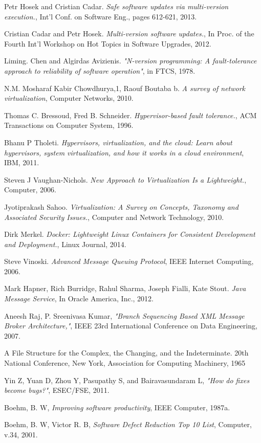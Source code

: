 \documentclass[a4paper,11pt,twoside]{report}
\begin{document}
\begin{thebibliography}{1}
  Petr Hosek and Cristian Cadar. {\em Safe software updates via multi-version execution.}, Int'l Conf. on Software Eng., pages 612-621, 2013.
 
  Cristian Cadar and Petr Hosek. {\em Multi-version software updates.}, In Proc. of the Fourth Int'l Workshop on Hot Topics in Software Upgrades, 2012.

 	 Liming. Chen and Algirdas Avizienis. {\em  "N-version programming: A fault-tolerance approach to reliability of software operation"}, in FTCS, 1978. 
   
	 N.M. Mosharaf Kabir Chowdhurya,1, Raouf Boutaba b. {\em A survey of network virtualization}, Computer Networks, 2010.
   
	 Thomas C. Bressoud, Fred B. Schneider. {\em Hypervisor-based fault tolerance.}, ACM 	Transactions on Computer System, 1996.
	   
  	 Bhanu P Tholeti. {\em Hypervisors, virtualization, and the cloud: Learn about hypervisors, system virtualization, and how it works in a cloud environment}, IBM, 2011. 

	  Steven J Vaughan-Nichols. {\em New Approach to Virtualization Is a Lightweight.}, Computer, 2006.  
	 
	   Jyotiprakash Sahoo. {\em Virtualization: A Survey on Concepts, Taxonomy and Associated Security Issues.}, Computer and Network Technology, 2010.
  
    Dirk Merkel. {\em Docker: Lightweight Linux Containers for Consistent Development and Deployment.}, Linux Journal, 2014.
	
	 Steve Vinoski. {\em Advanced Message Queuing Protocol}, IEEE Internet Computing, 2006. 

     Mark Hapner, Rich Burridge, Rahul Sharma, Joseph Fialli, Kate Stout. {\em Java Message Service}, In Oracle America, Inc., 2012.

 Aneesh Raj, P. Sreenivasa Kumar, {\em "Branch Sequencing Based XML Message Broker Architecture,"}, IEEE 23rd International Conference on Data Engineering, 2007.  

 A File Structure for the Complex, the Changing, and the Indeterminate. 20th National Conference, New York, Association for Computing Machinery, 1965

Yin Z, Yuan D, Zhou Y, Pasupathy S, and Bairavasundaram L, \textit{"How
do fixes become bugs?"}, ESEC/FSE, 2011.

Boehm, B. W, \textit{Improving software productivity}, IEEE Computer, 1987a.

 Boehm, B. W, Victor R. B, \textit{Software Defect Reduction Top 10 List}, Computer, v.34, 2001.



\end{thebibliography} 
\end{document}
